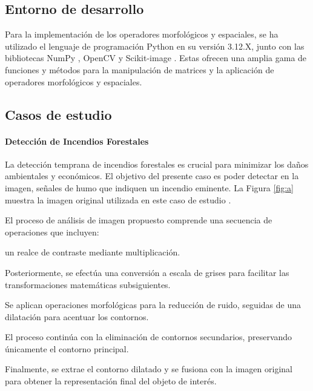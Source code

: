 \subsection{Entorno de desarrollo}
Para la implementación de los operadores morfológicos y espaciales, se ha utilizado el lenguaje de programación Python en su versión 3.12.X, junto con las bibliotecas NumPy \autocite{harris2020array}, OpenCV \autocite{opencv_library} y Scikit-image \autocite{van2014scikit}. Estas ofrecen una amplia gama de funciones y métodos para la manipulación de matrices y la aplicación de operadores morfológicos y espaciales.

\subsection{Casos de estudio}

\paragraph{Detección de Incendios Forestales} La detección temprana de incendios forestales es crucial para minimizar los daños ambientales y económicos.  El objetivo del presente caso es poder detectar en la imagen, señales de humo que indiquen un incendio eminente. La Figura \ref{fig:a} muestra la imagen original utilizada en este caso de estudio \autocite{WildfireDetectionImage}.

El proceso de análisis de imagen propuesto comprende una secuencia de operaciones que incluyen: 
\begin{seriate}

\item un realce de contraste mediante multiplicación. 

\item Posteriormente, se efectúa una conversión a escala de grises para facilitar las transformaciones matemáticas subsiguientes.

\item Se aplican operaciones morfológicas para la reducción de ruido, seguidas de una dilatación para acentuar los contornos.

\item El proceso continúa con la eliminación de contornos secundarios, preservando únicamente el contorno principal.

\item Finalmente, se extrae el contorno dilatado y se fusiona con la imagen original para obtener la representación final del objeto de interés. 
\end{seriate}

